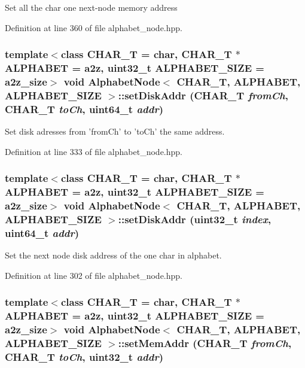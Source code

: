 Set all the char one next-node memory address 

Definition at line 360 of file alphabet\_\-node.hpp.\hypertarget{classAlphabetNode_cfbfa5139224c875c82d352e0661822a}{
\subsubsection[{setDiskAddr}]{\setlength{\rightskip}{0pt plus 5cm}template$<$class CHAR\_\-T  = char, CHAR\_\-T $\ast$ ALPHABET = a2z, uint32\_\-t ALPHABET\_\-SIZE = a2z\_\-size$>$ void {\bf AlphabetNode}$<$ CHAR\_\-T, ALPHABET, ALPHABET\_\-SIZE $>$::setDiskAddr (CHAR\_\-T {\em fromCh}, \/  CHAR\_\-T {\em toCh}, \/  uint64\_\-t {\em addr})}}
\label{classAlphabetNode_cfbfa5139224c875c82d352e0661822a}


Set disk adresses from 'fromCh' to 'toCh' the same address. 

Definition at line 333 of file alphabet\_\-node.hpp.\hypertarget{classAlphabetNode_7a3a05fb25fc9ca8a39585d0528dbb7a}{
\subsubsection[{setDiskAddr}]{\setlength{\rightskip}{0pt plus 5cm}template$<$class CHAR\_\-T  = char, CHAR\_\-T $\ast$ ALPHABET = a2z, uint32\_\-t ALPHABET\_\-SIZE = a2z\_\-size$>$ void {\bf AlphabetNode}$<$ CHAR\_\-T, ALPHABET, ALPHABET\_\-SIZE $>$::setDiskAddr (uint32\_\-t {\em index}, \/  uint64\_\-t {\em addr})}}
\label{classAlphabetNode_7a3a05fb25fc9ca8a39585d0528dbb7a}


Set the next node disk address of the one char in alphabet. 

Definition at line 302 of file alphabet\_\-node.hpp.\hypertarget{classAlphabetNode_df603448459185094253e572d805bf94}{
\subsubsection[{setMemAddr}]{\setlength{\rightskip}{0pt plus 5cm}template$<$class CHAR\_\-T  = char, CHAR\_\-T $\ast$ ALPHABET = a2z, uint32\_\-t ALPHABET\_\-SIZE = a2z\_\-size$>$ void {\bf AlphabetNode}$<$ CHAR\_\-T, ALPHABET, ALPHABET\_\-SIZE $>$::setMemAddr (CHAR\_\-T {\em fromCh}, \/  CHAR\_\-T {\em toCh}, \/  uint32\_\-t {\em addr})}}
\label{classAlphabetNode_df603448459185094253e572d805bf94}


